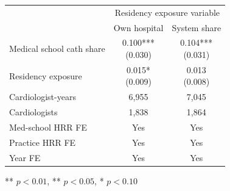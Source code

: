\begin{threeparttable}
\begin{tabular}{lcc}
\toprule
 & \multicolumn{2}{c}{Residency exposure variable} \\
\cmidrule(lr){2-3} 
 & Own hospital & System share\\
\midrule
Medical school cath share & \shortstack[c]{0.100*** \\ (0.030)} & \shortstack[c]{0.104*** \\ (0.031)}  \\
Residency exposure & \shortstack[c]{0.015* \\ (0.009)} & \shortstack[c]{0.013 \\ (0.008)} \\
\midrule
Cardiologist-years & 6,955 & 7,045  \\
Cardiologists & 1,838 & 1,864  \\
Med-school HRR FE & Yes & Yes \\
Practice HRR FE & Yes & Yes \\
Year FE & Yes & Yes  \\
\bottomrule
\end{tabular}
\begin{tablenotes}[flushleft]
\footnotesize
\item *** $p < 0.01$, ** $p < 0.05$, * $p < 0.10$
\end{tablenotes}
\end{threeparttable}


